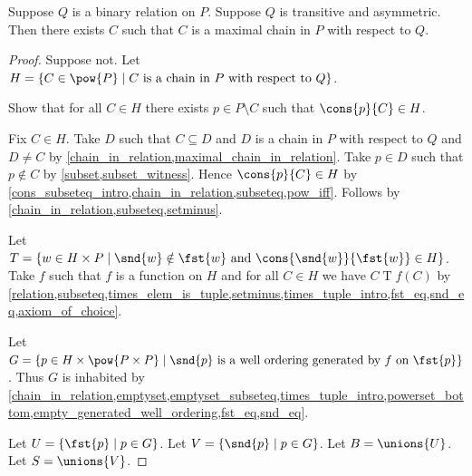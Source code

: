 \begin{lemma}\label{hausdorff_maximal_chain}
    Suppose $Q$ is a binary relation on $P$.
    Suppose $Q$ is transitive and asymmetric.
    Then there exists $C$ such that $C$ is a maximal chain in $P$ with respect to $Q$.
\end{lemma}
\begin{proof}
    Suppose not.
    Let $H=\{C\in\pow{P}\mid \text{$C$ is a chain in $P$ with respect to $Q$}\}$.

    Show that for all $C\in H$ there exists $p\in P\setminus C$ such that $\cons{p}{C}\in H$.
    \begin{subproof}
        Fix $C\in H$.
        Take $D$ such that $C\subseteq D$ and $D$ is a chain in $P$ with respect to $Q$ and $D\neq C$
            by \cref{chain_in_relation,maximal_chain_in_relation}.
        Take $p\in D$ such that $p\notin C$ by \cref{subset,subset_witness}.
        Hence $\cons{p}{C}\in H$
            by \cref{cons_subseteq_intro,chain_in_relation,subseteq,pow_iff}.
        Follows by \cref{chain_in_relation,subseteq,setminus}.
    \end{subproof}

    Let $T=\{w\in H\times P\mid \text{$\snd{w}\notin\fst{w}$ and $\cons{\snd{w}}{\fst{w}}\in H$}\}$.
    Take $f$ such that $f$ is a function on $H$ and for all $C\in H$ we have $C\mathrel{T}f(C)$
        by \cref{relation,subseteq,times_elem_is_tuple,setminus,times_tuple_intro,fst_eq,snd_eq,axiom_of_choice}.

    Let $G=\{p\in H\times\pow{P\times P}\mid \text{$\snd{p}$ is a well ordering generated by $f$ on $\fst{p}$}\}$.
    Thus $G$ is inhabited
        by \cref{chain_in_relation,emptyset,emptyset_subseteq,times_tuple_intro,powerset_bottom,empty_generated_well_ordering,fst_eq,snd_eq}.

    Let $U=\{\fst{p}\mid p\in G\}$.
    Let $V=\{\snd{p}\mid p\in G\}$.
    Let $B=\unions{U}$.
    Let $S=\unions{V}$.


\end{proof}

